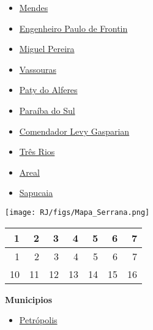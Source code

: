 \documentclass[10pt]{article} %
\begin{document}
\begin{minipage}[t]{.30\linewidth}
\begin{mdframed}[style=sidebar,frametitle={}]
\begin{itemize}
\item \hyperlink{https:/alerta.dengue.mat.br/alerta/3302809}{Mendes}
\item \hyperlink{https:/alerta.dengue.mat.br/alerta/3301801}{Engenheiro Paulo de Frontin}
\item \hyperlink{https:/alerta.dengue.mat.br/alerta/3302908}{Miguel Pereira}
\item \hyperlink{https:/alerta.dengue.mat.br/alerta/3306206}{Vassouras}
\item \hyperlink{https:/alerta.dengue.mat.br/alerta/3303856}{Paty do Alferes}
\item \hyperlink{https:/alerta.dengue.mat.br/alerta/3303708}{Paraíba do Sul}
\item \hyperlink{https:/alerta.dengue.mat.br/alerta/3300951}{Comendador Levy Gasparian}
\item \hyperlink{https:/alerta.dengue.mat.br/alerta/3306008}{Três Rios}
\item \hyperlink{https:/alerta.dengue.mat.br/alerta/3300225}{Areal}
\item \hyperlink{https:/alerta.dengue.mat.br/alerta/3305406}{Sapucaia}
\end{itemize}\end{mdframed}\hfill\end{minipage}\newpage\begin{minipage}[t]{.66\linewidth}
\hypertarget{ Srrn }{}
\texttt{[image: RJ/figs/Mapa\_Serrana.png]}\vspace{0.5cm}\begin{center}
\begin{tabular}{rrrrrrr}
  \hline
1 & 2 & 3 & 4 & 5 & 6 & 7 \\ 
  \hline
  1 &   2 &   3 &   4 &   5 &   6 &   7 \\ 
   10 &  11 &  12 &  13 &  14 &  15 &  16 \\ 
   \hline
\end{tabular}
\end{center}
\end{minipage}\hfill\begin{minipage}[t]{.30\linewidth}
\begin{mdframed}[style=sidebar,frametitle={}]
\textbf{Municipios}\begin{itemize}\item \hyperlink{https:/alerta.dengue.mat.br/alerta/3303906}{Petrópolis}

\end{itemize}
\end{mdframed}
\end{minipage}
\end{document}
